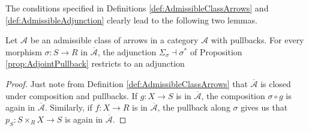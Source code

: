 The conditions specified in Definitions \ref{def:AdmissibleClassArrows} and \ref{def:AdmissibleAdjunction} clearly lead to the following two lemmas.
\begin{lemma}
    Let $\mathcal{A}$ be an admissible class of arrows in a category $\mathcal{A}$ with pullbacks. For every morphism $\sigma:S\to R$ in $\overline{\mathcal{A}}$, the adjunction $\Sigma_\sigma\dashv\sigma^*$ of Proposition \ref{prop:AdjointPullback} restricts to an adjunction
    \begin{center}
    \end{center}
    \begin{proof}
        Just note from Definition \ref{def:AdmissibleClassArrows} that $\overline{\mathcal{A}}$ is closed under composition and pullbacks. If $g:X\to S$ is in $\overline{\mathcal{A}}$, the composition $\sigma\circ g$ is again in $\overline{\mathcal{A}}$. Similarly, if $f:X\to R$ is in $\overline{\mathcal{A}}$, the pullback along $\sigma$ gives us that $p_S:S\times_RX\to S$ is again in $\overline{\mathcal{A}}$. 
    \end{proof}
\end{lemma}
